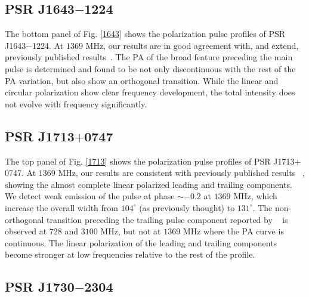 \documentclass[useAMS,usenatbib]{mn2e}
\begin{document}
\begin{appendices}
\subsection{PSR J1643$-$1224}

The bottom panel of Fig. \ref{1643} shows the polarization pulse profiles of 
PSR J1643$-$1224.
%
At $1369$ MHz, our results are in good agreement with, and extend, previously published
results~\citep{Ord04,Yan11}.
%
The PA of the broad feature preceding the main pulse is determined and 
found to be not only discontinuous with the rest of the PA variation, but 
also show an orthogonal transition.
%
While the linear and circular polarization show clear frequency development,
the total intensity does not evolve with frequency significantly.


\subsection{PSR J1713$+$0747}

The top panel of Fig. \ref{1713} shows the polarization pulse profiles of 
PSR J1713$+$0747. 
%
At $1369$ MHz, our results are consistent with previously published results
~\citep{Ord04,Yan11}, showing the almost complete linear polarized leading and 
trailing components.
%
We detect weak emission of the pulse at phase $\sim-0.2$ at $1369$ MHz, which 
increase the overall width from $104^{\circ}$ (as previously thought) to 
$131^{\circ}$. 
%
The non-orthogonal transition preceding the trailing pulse component reported 
by ~\citet{Yan11} is observed at $728$ and $3100$ MHz, but not at $1369$ MHz 
where the PA curve is continuous.
%
The linear polarization of the leading and trailing components become stronger 
at low frequencies relative to the rest of the profile.


\subsection{PSR J1730$-$2304}


\end{appendices}
\end{document}
